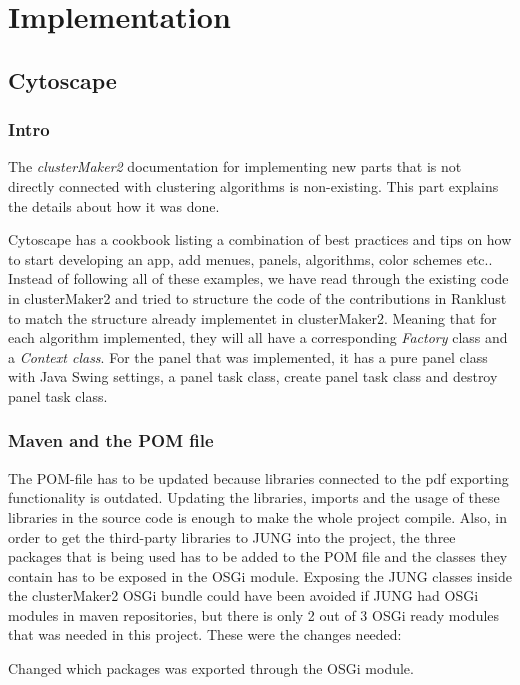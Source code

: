 \part{Implementation}
\label{pa:implementation}
\chapter{Cytoscape}
\section{Intro}
The \textit{clusterMaker2} documentation for implementing new parts that is not
directly connected with clustering algorithms is non-existing. This part
explains the details about how it was done.

Cytoscape has a cookbook\cite{cytoscape-cookbook} listing a combination of best
practices and tips on how to start developing an app, add menues, panels,
algorithms, color schemes etc.. Instead of following all of these examples, we
have read through the existing code in clusterMaker2\cite{cm2-github} and tried
to structure the code of the contributions in Ranklust to match the structure
already implementet in clusterMaker2. Meaning that for each algorithm
implemented, they will all have a corresponding \textit{Factory} class and a
\textit{Context class}. For the panel that was implemented, it has a pure panel
class with Java Swing\cite{java-swing} settings, a panel task class, create
panel task class and destroy panel task class. %

\section{Maven and the POM file}
The POM-file has to be updated because libraries connected to the pdf exporting
functionality is outdated. Updating the libraries, imports and the usage of
these libraries in the source code is enough to make the whole project compile.
Also, in order to get the third-party libraries to JUNG\cite{jung} into the
project, the three packages that is being used has to be added to the POM file
and the classes they contain has to be exposed in the OSGi
module\cite{osgi-felix}. Exposing the JUNG classes inside the clusterMaker2 OSGi
bundle could have been avoided if JUNG had OSGi modules in maven repositories,
but there is only 2 out of 3 OSGi ready modules that was needed in this project.
These were the changes needed:

Changed which packages was exported through the OSGi module.

